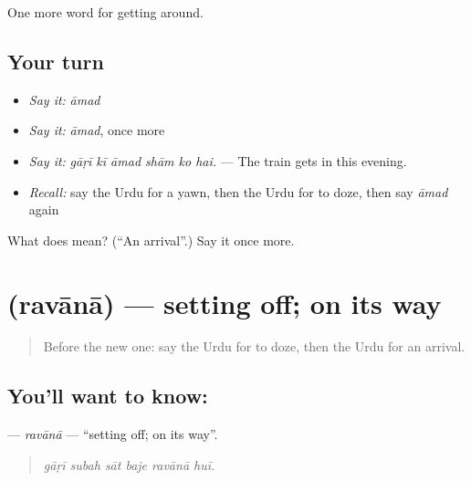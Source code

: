 \begin{grammarlens}[title={What you've built}]
One more word for getting around.
\end{grammarlens}

\subsection*{Your turn}
\begin{itemize}
\raggedright
  \item \emph{Say it:} \emph{āmad}
  \item \emph{Say it:} \emph{āmad}, once more
  \item \emph{Say it:} \emph{gāṛī kī āmad shām ko hai.} — The train gets in this evening.
  \item \emph{Recall:} say the Urdu for a yawn, then the Urdu for to doze, then say \emph{āmad} again
\end{itemize}

\begin{tcolorbox}[breakable,colback=teal!4,colframe=teal!35!black,title={Before you move on}]
What does  mean? (\textquotedblleft{}An arrival\textquotedblright{}.) Say it once more.
\end{tcolorbox}
\section[\texorpdfstring{\ur{روانہ} (ravānā)}{روانہ (ravānā)}]{ (ravānā) — setting off; on its way}

\label{lesson:UR-C390-ravana}



\begin{quote}
Before the new one: say the Urdu for to doze, then the Urdu for an arrival.
\end{quote}

\subsection*{You'll want to know: }
\textbf{} — \emph{ravānā} — \textquotedblleft{}setting off; on its way\textquotedblright{}.

\begin{quote}
     
\end{quote}

\begin{quote}
\emph{gāṛī subah sāt baje ravānā huī.}
\end{quote}

